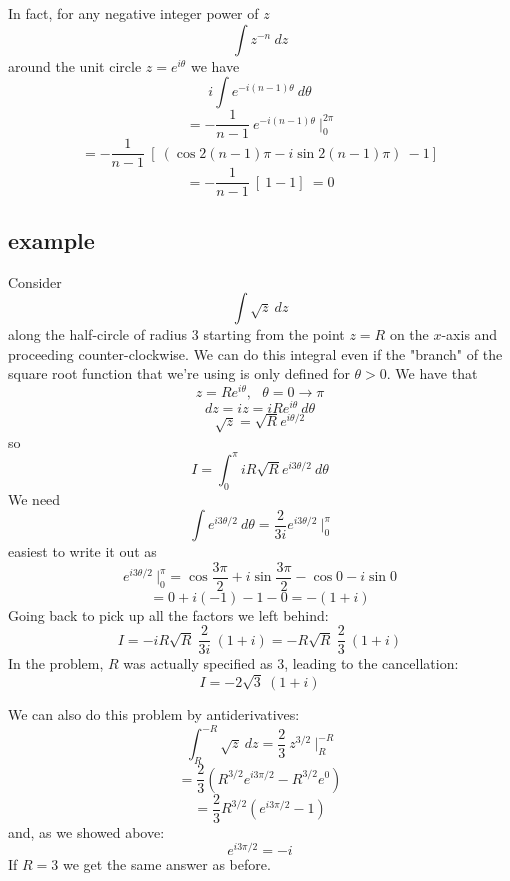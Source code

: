 \documentclass[11pt, oneside]{article}
\begin{document}
In fact, for any negative integer power of $z$
\[ \int z^{-n} \ dz \]
around the unit circle $z=e^{i\theta}$ we have
\[ i \int e^{-i(n-1)\theta} \ d \theta \]
\[ = -\frac{1}{n-1} \ e^{-i(n-1)\theta} \ \bigg |_0^{2 \pi}  \]
\[ = -\frac{1}{n-1} \ [ \ (\cos 2 (n-1) \pi - i \sin 2 (n-1) \pi ) \ - 1 ]   \]
\[ = -\frac{1}{n-1} \ [ \ 1  - 1 ] \ = 0  \]

\subsection*{example}
Consider
\[ \int \sqrt{z} \ dz \]
along the half-circle of radius $3$ starting from the point $z = R$ on the $x$-axis and proceeding counter-clockwise.
We can do this integral even if the "branch" of the square root function that we're using is only defined for $\theta > 0$.  We have that 
\[ z = Re^{i\theta}, \ \ \ \theta = 0 \rightarrow \pi \]
\[ dz = iz = iRe^{i\theta} \ d \theta \]
\[ \sqrt{z} = \sqrt{R} e^{i\theta/2} \]
so
\[ I = \int_0^{\pi} iR \sqrt{R} e^{i3\theta/2} \ d \theta \]
We need
\[ \int e^{i3\theta/2} \ d \theta = \frac{2}{3i} e^{i3\theta/2} \ \bigg |_0^{\pi} \]
easiest to write it out as
\[ e^{i3\theta/2} \ \bigg |_0^{\pi} = \cos \frac{3\pi}{2} + i \sin  \frac{3\pi}{2} - \cos 0 - i \sin 0 \]
\[ = 0 + i(-1) - 1 - 0 = -(1+i) \]
Going back to pick up all the factors we left behind:
\[ I = -iR \sqrt{R} \ \frac{2}{3i} \ (1+i) = -R \sqrt{R} \ \frac{2}{3} \ (1+i) \]
In the problem, $R$ was actually specified as $3$, leading to the cancellation:
\[ I = - 2 \sqrt{3} \ (1+i) \]

We can also do this problem by antiderivatives:
\[ \int_R^{-R} \sqrt{z} \ dz = \frac{2}{3} \ z^{3/2} \ \bigg |_R^{-R}  \]
\[ = \frac{2}{3} ( R^{3/2} e^{i3\pi/2} - R^{3/2} e^0) \]
\[ = \frac{2}{3} R^{3/2} ( e^{i3\pi/2} - 1) \]
and, as we showed above:
\[ e^{i3\pi/2} = -i \]
If $R=3$ we get the same answer as before.
\end{document}
